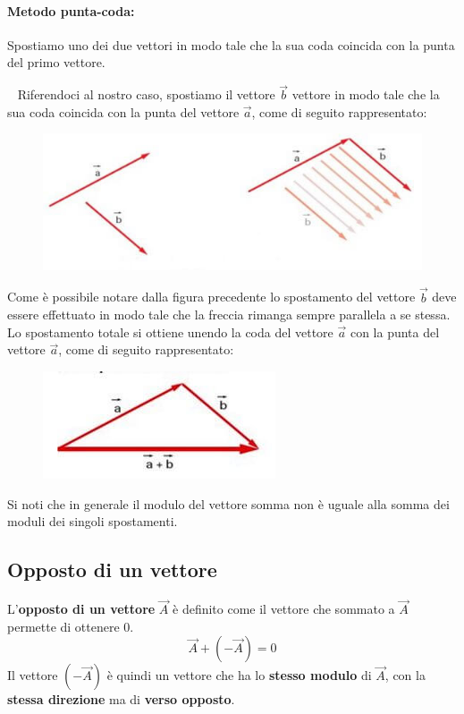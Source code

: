 \documentclass[a4paper,11pt,oneside]{book}
\begin{document}
\paragraph{Metodo punta-coda:} Spostiamo uno dei due vettori in modo tale che la sua coda coincida con la punta del primo vettore.

~\newline
\noindent Riferendoci al nostro caso, spostiamo il vettore $\vec{b}$ vettore in modo tale che la sua coda coincida con la
punta del vettore $\vec{a}$, come di seguito rappresentato:
\begin{figure}[h]
    \includegraphics[scale=0.5]{punta_coda}
    \centering
\end{figure}

Come è possibile notare dalla figura precedente lo spostamento del vettore $\vec{b}$ deve essere effettuato in modo
tale che la freccia rimanga sempre parallela a se stessa.
Lo spostamento totale si ottiene unendo la coda del vettore $\vec{a}$ con la punta del vettore $\vec{a}$, come di seguito
rappresentato:
\begin{figure}[h]
    \includegraphics[scale=0.5]{vettori_sommati}
    \centering
\end{figure}

Si noti che in generale il modulo del vettore somma non è uguale alla somma dei moduli dei singoli spostamenti.

\subsection{Opposto di un vettore}
L'\textbf{opposto di un vettore} $\vec{A}$ è definito come il vettore che sommato a $\vec{A}$ permette di ottenere 0.
\begin{equation*}
    \vec{A} + (- \vec{A} ) = 0
\end{equation*}
Il vettore $(-\vec{A})$ è quindi un vettore che ha lo \textbf{stesso modulo} di $\vec{A}$, con la \textbf{stessa direzione} ma di \textbf{verso opposto}.
\end{document}
